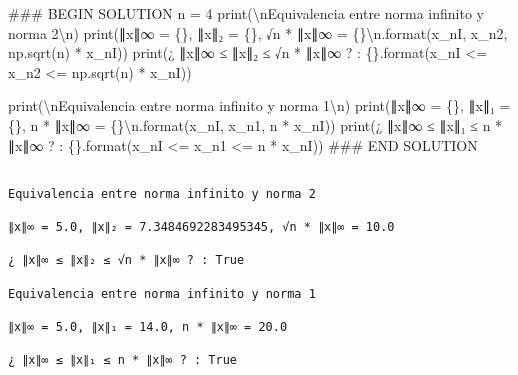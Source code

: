 \documentclass[
  letterpaper,
  DIV=11,
  numbers=noendperiod]{scrreprt}
\newenvironment{Shaded}{\begin{snugshade}}{\end{snugshade}}
\newcommand{\BuiltInTok}[1]{\textcolor[rgb]{0.00,0.23,0.31}{#1}}
\newcommand{\CharTok}[1]{\textcolor[rgb]{0.13,0.47,0.30}{#1}}
\newcommand{\CommentTok}[1]{\textcolor[rgb]{0.37,0.37,0.37}{#1}}
\newcommand{\DecValTok}[1]{\textcolor[rgb]{0.68,0.00,0.00}{#1}}
\newcommand{\NormalTok}[1]{\textcolor[rgb]{0.00,0.23,0.31}{#1}}
\newcommand{\OperatorTok}[1]{\textcolor[rgb]{0.37,0.37,0.37}{#1}}
\newcommand{\RegionMarkerTok}[1]{\textcolor[rgb]{0.00,0.23,0.31}{#1}}
\newcommand{\SpecialCharTok}[1]{\textcolor[rgb]{0.37,0.37,0.37}{#1}}
\newcommand{\StringTok}[1]{\textcolor[rgb]{0.13,0.47,0.30}{#1}}
\begin{document}
\begin{Shaded}
\begin{Highlighting}[]
\CommentTok{\#\#\# }\RegionMarkerTok{BEGIN}\CommentTok{ SOLUTION}
\NormalTok{n }\OperatorTok{=} \DecValTok{4}
\BuiltInTok{print}\NormalTok{(}\StringTok{\textquotesingle{}}\CharTok{\textbackslash{}n}\StringTok{Equivalencia entre norma infinito y norma 2}\CharTok{\textbackslash{}n}\StringTok{\textquotesingle{}}\NormalTok{)}
\BuiltInTok{print}\NormalTok{(}\StringTok{\textquotesingle{}∥x∥∞ = }\SpecialCharTok{\{\}}\StringTok{, ∥x∥₂ = }\SpecialCharTok{\{\}}\StringTok{, √n * ∥x∥∞ = }\SpecialCharTok{\{\}}\CharTok{\textbackslash{}n}\StringTok{\textquotesingle{}}\NormalTok{.}\BuiltInTok{format}\NormalTok{(x\_nI, x\_n2, np.sqrt(n) }\OperatorTok{*}\NormalTok{ x\_nI))}
\BuiltInTok{print}\NormalTok{(}\StringTok{\textquotesingle{}¿ ∥x∥∞ ≤ ∥x∥₂ ≤ √n * ∥x∥∞ ? : }\SpecialCharTok{\{\}}\StringTok{\textquotesingle{}}\NormalTok{.}\BuiltInTok{format}\NormalTok{(x\_nI }\OperatorTok{\textless{}=}\NormalTok{ x\_n2 }\OperatorTok{\textless{}=}\NormalTok{ np.sqrt(n) }\OperatorTok{*}\NormalTok{ x\_nI))}

\BuiltInTok{print}\NormalTok{(}\StringTok{\textquotesingle{}}\CharTok{\textbackslash{}n}\StringTok{Equivalencia entre norma infinito y norma 1}\CharTok{\textbackslash{}n}\StringTok{\textquotesingle{}}\NormalTok{)}
\BuiltInTok{print}\NormalTok{(}\StringTok{\textquotesingle{}∥x∥∞ = }\SpecialCharTok{\{\}}\StringTok{, ∥x∥₁ = }\SpecialCharTok{\{\}}\StringTok{, n * ∥x∥∞ = }\SpecialCharTok{\{\}}\CharTok{\textbackslash{}n}\StringTok{\textquotesingle{}}\NormalTok{.}\BuiltInTok{format}\NormalTok{(x\_nI, x\_n1, n }\OperatorTok{*}\NormalTok{ x\_nI))}
\BuiltInTok{print}\NormalTok{(}\StringTok{\textquotesingle{}¿ ∥x∥∞ ≤ ∥x∥₁ ≤ n * ∥x∥∞ ? : }\SpecialCharTok{\{\}}\StringTok{\textquotesingle{}}\NormalTok{.}\BuiltInTok{format}\NormalTok{(x\_nI }\OperatorTok{\textless{}=}\NormalTok{ x\_n1 }\OperatorTok{\textless{}=}\NormalTok{ n }\OperatorTok{*}\NormalTok{ x\_nI))}
\CommentTok{\#\#\# }\RegionMarkerTok{END}\CommentTok{ SOLUTION}
\end{Highlighting}
\end{Shaded}

\begin{verbatim}

Equivalencia entre norma infinito y norma 2

∥x∥∞ = 5.0, ∥x∥₂ = 7.3484692283495345, √n * ∥x∥∞ = 10.0

¿ ∥x∥∞ ≤ ∥x∥₂ ≤ √n * ∥x∥∞ ? : True

Equivalencia entre norma infinito y norma 1

∥x∥∞ = 5.0, ∥x∥₁ = 14.0, n * ∥x∥∞ = 20.0

¿ ∥x∥∞ ≤ ∥x∥₁ ≤ n * ∥x∥∞ ? : True
\end{verbatim}
\end{document}
